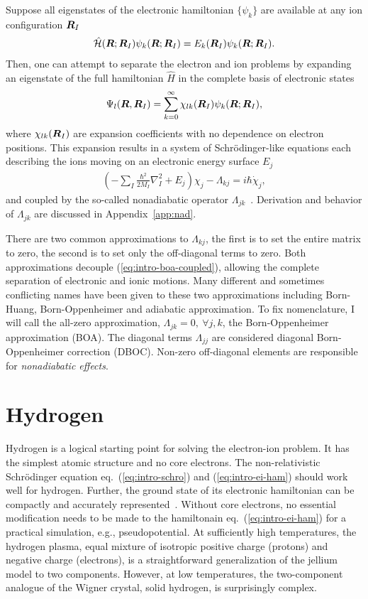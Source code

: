 Suppose all eigenstates of the electronic hamiltonian $\{\psi_k\}$ are available at any ion configuration $\boldsymbol{R}_I$
\begin{align}
\hat{\mathcal{H}} (\boldsymbol{R};\boldsymbol{R}_I) \psi_k(\boldsymbol{R};\boldsymbol{R}_I) = E_k(\boldsymbol{R}_I) \psi_k(\boldsymbol{R};\boldsymbol{R}_I).
\end{align}
Then, one can attempt to separate the electron and ion problems by expanding an eigenstate of the full hamiltonian $\hat{H}$ in the complete basis of electronic states
\begin{align}
\Psi_l(\boldsymbol{R},\boldsymbol{R}_I) = \sum_{k=0}^\infty \chi_{lk}(\boldsymbol{R}_I)\psi_k(\boldsymbol{R};\boldsymbol{R}_I),
\end{align}
where $\chi_{lk}(\boldsymbol{R}_I)$ are expansion coefficients with no dependence on electron positions. This expansion results in a system of Schr\"odinger-like equations each describing the ions moving on an electronic energy surface $E_j$
\begin{align}
\left(-\sum_I\frac{\hbar^2}{2M_I}\nabla^2_I+E_j\right)\chi_j - \Lambda_{kj} = i\hbar\dot{\chi}_j,
\end{align}
and coupled by the so-called nonadiabatic operator $\Lambda_{jk}$~\cite{Worth2004}.
Derivation and behavior of $\Lambda_{jk}$ are discussed in Appendix~\ref{app:nad}.

There are two common approximations to $\Lambda_{kj}$, the first is to set the entire matrix to zero, the second is to set only the off-diagonal terms to zero. Both approximations decouple (\ref{eq:intro-boa-coupled}), allowing the complete separation of electronic and ionic motions.
Many different and sometimes conflicting names have been given to these two approximations including Born-Huang, Born-Oppenheimer and adiabatic approximation.
To fix nomenclature, I will call the all-zero approximation, $\Lambda_{jk}=0,~\forall j, k$, the Born-Oppenheimer approximation (BOA).
The diagonal terms $\Lambda_{jj}$ are considered diagonal Born-Oppenheimer correction (DBOC).
Non-zero off-diagonal elements are responsible for \textit{nonadiabatic effects}.

\section{Hydrogen}
Hydrogen is a logical starting point for solving the electron-ion problem.
It has the simplest atomic structure and no core electrons.
The non-relativistic Schr\"odinger equation eq.~(\ref{eq:intro-schro}) and (\ref{eq:intro-ei-ham}) should work well for hydrogen. Further, the ground state of its electronic hamiltonian can be compactly and accurately represented~\cite{Holzmann2003}.
Without core electrons, no essential modification needs to be made to the hamiltonain eq.~(\ref{eq:intro-ei-ham}) for a practical simulation, e.g., pseudopotential.
At sufficiently high temperatures, the hydrogen plasma, equal mixture of isotropic positive charge (protons) and negative charge (electrons), is a straightforward generalization of the jellium model to two components. However, at low temperatures, the two-component analogue of the Wigner crystal, solid hydrogen, is surprisingly complex.

